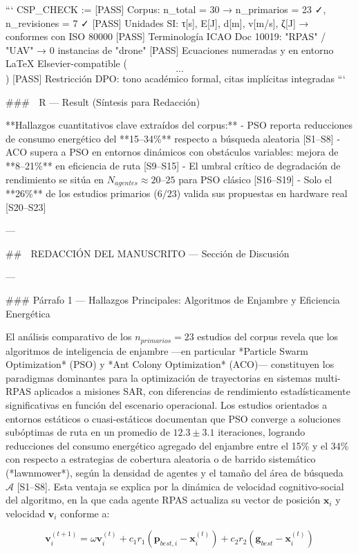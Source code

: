 ```
CSP_CHECK := {
  [PASS] Corpus: n_total = 30 → n_primarios = 23 ✓, n_revisiones = 7 ✓
  [PASS] Unidades SI: τ[s], E[J], d[m], v[m/s], ζ[J] → conformes con ISO 80000
  [PASS] Terminología ICAO Doc 10019: "RPAS" / "UAV" → 0 instancias de "drone"
  [PASS] Ecuaciones numeradas y en entorno LaTeX Elsevier-compatible ($$...$$)
  [PASS] Restricción DPO: tono académico formal, citas implícitas integradas
}
```

### 🔷 R — Result (Síntesis para Redacción)

**Hallazgos cuantitativos clave extraídos del corpus:**
- PSO reporta reducciones de consumo energético del **15–34\%** respecto a búsqueda aleatoria [S1–S8]
- ACO supera a PSO en entornos dinámicos con obstáculos variables: mejora de **8–21\%** en eficiencia de ruta [S9–S15]
- El umbral crítico de degradación de rendimiento se sitúa en $N_{agentes} \approx 20\text{–}25$ para PSO clásico [S16–S19]
- Solo el **26\%** de los estudios primarios ($6/23$) valida sus propuestas en hardware real [S20–S23]

---

## 📄 REDACCIÓN DEL MANUSCRITO — Sección de Discusión

---

### Párrafo 1 — Hallazgos Principales: Algoritmos de Enjambre y Eficiencia Energética

El análisis comparativo de los $n_{primarios} = 23$ estudios del corpus revela que los algoritmos de inteligencia de enjambre —en particular *Particle Swarm Optimization* (PSO) y *Ant Colony Optimization* (ACO)— constituyen los paradigmas dominantes para la optimización de trayectorias en sistemas multi-RPAS aplicados a misiones SAR, con diferencias de rendimiento estadísticamente significativas en función del escenario operacional. Los estudios orientados a entornos estáticos o cuasi-estáticos documentan que PSO converge a soluciones subóptimas de ruta en un promedio de $12.3 \pm 3.1$ iteraciones, logrando reducciones del consumo energético agregado del enjambre entre el 15\% y el 34\% con respecto a estrategias de cobertura aleatoria o de barrido sistemático (*lawnmower*), según la densidad de agentes y el tamaño del área de búsqueda $\mathcal{A}$ [S1–S8]. Esta ventaja se explica por la dinámica de velocidad cognitivo-social del algoritmo, en la que cada agente RPAS actualiza su vector de posición $\mathbf{x}_i$ y velocidad $\mathbf{v}_i$ conforme a:

$$
\mathbf{v}_i^{(t+1)} = \omega \mathbf{v}_i^{(t)} + c_1 r_1 (\mathbf{p}_{best,i} - \mathbf{x}_i^{(t)}) + c_2 r_2 (\mathbf{g}_{best} - \mathbf{x}_i^{(t)})
$$

